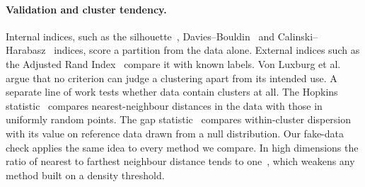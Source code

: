\paragraph{Validation and cluster tendency.} Internal indices, such as the
silhouette~\cite{rousseeuw1987}, Davies--Bouldin~\cite{davies1979} and
Calinski--Harabasz~\cite{calinski1974} indices, score a partition from the data
alone. External indices such as the Adjusted Rand Index~\cite{hubert1985} compare it
with known labels. Von Luxburg et al.~\cite{luxburg2012} argue that no criterion can
judge a clustering apart from its intended use. A separate line of work tests whether
data contain clusters at all. The Hopkins statistic~\cite{hopkins1954} compares
nearest-neighbour distances in the data with those in uniformly random points. The
gap statistic~\cite{tibshirani2001} compares within-cluster dispersion with its value
on reference data drawn from a null distribution. Our fake-data check applies the
same idea to every method we compare. In high dimensions the ratio of nearest to
farthest neighbour distance tends to one~\cite{beyer1999}, which weakens any method
built on a density threshold.
